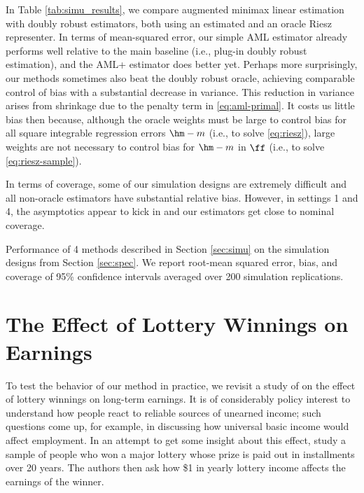 \documentclass[aos,submission]{imsart}
\theoremstyle{plain}
\theoremstyle{remark}
\begin{document}
In Table \ref{tab:simu_results}, we compare augmented minimax linear estimation
with doubly robust estimators, both using an estimated and an oracle Riesz representer.
In terms of mean-squared error, our simple AML estimator already performs well relative to
the main baseline (i.e., plug-in doubly robust estimation), and the AML+ estimator does better yet. Perhaps more surprisingly, our methods sometimes also
beat the doubly robust oracle, achieving comparable control of bias with a substantial decrease in variance. 
This reduction in variance arises from shrinkage due to the penalty term in \eqref{eq:aml-primal}.
It costs us little bias then because, although the oracle weights must be large to control bias
for all square integrable regression errors $\hm - m$ (i.e., to solve \ref{eq:riesz}), 
large weights are not necessary to control bias for $\hm - m$ in $\ff$ (i.e., to solve \ref{eq:riesz-sample}).


In terms of coverage, some of our simulation designs are extremely difficult and all non-oracle estimators
have substantial relative bias. However, in settings 1 and 4, the asymptotics
appear to kick in and our estimators get close to nominal coverage.

\setlength{\tabcolsep}{5pt}
\begin{table}[t]
\centering
\makebox[\textwidth]{

}
\caption[Performance of AMLE and baselines in simulation.]{Performance of 4 methods described in Section \ref{sec:simu} on
the simulation designs from Section \ref{sec:spec}. We report root-mean squared error,
bias, and coverage of 95\% confidence intervals averaged over 200 simulation replications.}
\label{tab:simu_results}
\end{table}
\setlength{\tabcolsep}{6pt}


\section{The Effect of Lottery Winnings on Earnings}
\label{sec:application}

To test the behavior of our method in practice, we revisit a study of
\citet*{imbens2001estimating} on the effect of lottery winnings on
long-term earnings. It is of considerably policy interest to understand
how people react to reliable sources of unearned income; such questions
come up, for example, in discussing how universal basic income would affect employment.
In an attempt to get some insight about this effect, \citet*{imbens2001estimating}
study a sample of people who won a major lottery whose prize is paid out in installments
over 20 years. The authors then ask how \$1 in yearly lottery
income affects the earnings of the winner.
\end{document}
